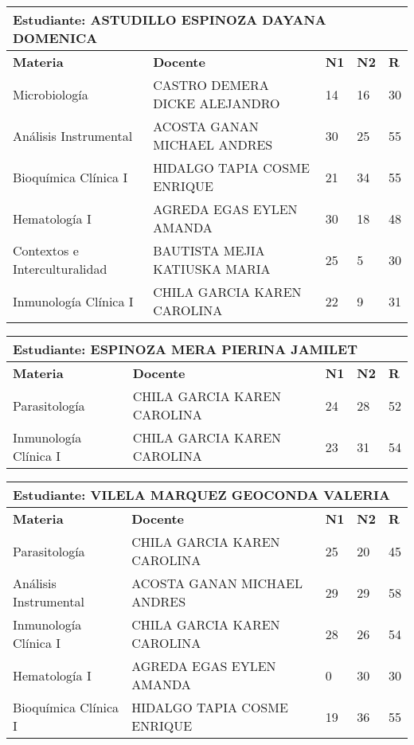 \begin{tabularx}{\textwidth}{|p{5cm}|p{7cm}|X|X|X|}
\hline
\multicolumn{5}{|p{\dimexpr\textwidth-2\tabcolsep-2\arrayrulewidth}|}{\textbf{Estudiante: ASTUDILLO ESPINOZA DAYANA DOMENICA }}\\\hline
\textbf{Materia} & \textbf{Docente} & \textbf{N1} & \textbf{N2} & \textbf{R} \\ \hline
Microbiología & CASTRO DEMERA DICKE ALEJANDRO  & 14 & 16& 30 \\ \hline
Análisis Instrumental & ACOSTA GANAN MICHAEL ANDRES  & 30 & 25& 55 \\ \hline
Bioquímica Clínica I & HIDALGO TAPIA COSME ENRIQUE  & 21 & 34& 55 \\ \hline
Hematología I & AGREDA EGAS EYLEN AMANDA  & 30 & 18& 48 \\ \hline
Contextos e Interculturalidad & BAUTISTA MEJIA KATIUSKA MARIA  & 25 & 5& 30 \\ \hline
Inmunología Clínica I & CHILA GARCIA KAREN CAROLINA  & 22 & 9& 31 \\ \hline
\end{tabularx}\vspace{10mm}
\small
\begin{tabularx}{\textwidth}{|p{5cm}|p{7cm}|X|X|X|}
\hline
\multicolumn{5}{|p{\dimexpr\textwidth-2\tabcolsep-2\arrayrulewidth}|}{\textbf{Estudiante: ESPINOZA MERA PIERINA JAMILET }}\\\hline
\textbf{Materia} & \textbf{Docente} & \textbf{N1} & \textbf{N2} & \textbf{R} \\ \hline
Parasitología & CHILA GARCIA KAREN CAROLINA  & 24 & 28& 52 \\ \hline
Inmunología Clínica I & CHILA GARCIA KAREN CAROLINA  & 23 & 31& 54 \\ \hline
\end{tabularx}\vspace{10mm}
\small
\begin{tabularx}{\textwidth}{|p{5cm}|p{7cm}|X|X|X|}
\hline
\multicolumn{5}{|p{\dimexpr\textwidth-2\tabcolsep-2\arrayrulewidth}|}{\textbf{Estudiante: VILELA MARQUEZ GEOCONDA VALERIA }}\\\hline
\textbf{Materia} & \textbf{Docente} & \textbf{N1} & \textbf{N2} & \textbf{R} \\ \hline
Parasitología & CHILA GARCIA KAREN CAROLINA  & 25 & 20& 45 \\ \hline
Análisis Instrumental & ACOSTA GANAN MICHAEL ANDRES  & 29 & 29& 58 \\ \hline
Inmunología Clínica I & CHILA GARCIA KAREN CAROLINA  & 28 & 26& 54 \\ \hline
Hematología I & AGREDA EGAS EYLEN AMANDA  & 0 & 30& 30 \\ \hline
Bioquímica Clínica I & HIDALGO TAPIA COSME ENRIQUE  & 19 & 36& 55 \\ \hline
\end{tabularx}\vspace{10mm}
